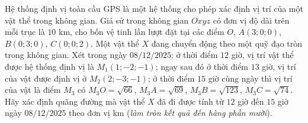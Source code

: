 \begin{ex}%
	Hệ thống định vị toàn cầu GPS là một hệ thống cho phép xác định vị trí của một vật thể trong không gian. Giả sử trong không gian $Oxyz$ có đơn vị độ dài trên mỗi trục là $10$ km, cho bốn vệ tinh lần lượt đặt tại các điểm $O$, $A(3;0;0)$, $B(0;3;0)$, $C(0;0;2)$. Một vật thể $X$ đang chuyển động theo một quỹ đạo tròn trong không gian. Xét trong ngày $08/12/2025$: ở thời điểm $12$ giờ, vị trí vật thể được hệ thống định vị là $M_1(1;-2;-1)$; ngay sau đó ở thời điểm $13$ giờ, vị trí của vật được định vị ở $M_2(2;-3;-1)$; ở thời điểm $15$ giờ cùng ngày thì vị trí của vật là điểm $M_3$ có $M_3O= \sqrt{66}$, $M_3A = \sqrt{69}$, $M_3B = \sqrt{123}$, $M_3C = \sqrt{74}$. Hãy xác định quãng đường mà vật thể $X$ đã đi được tính từ $12$ giờ đến $15$ giờ ngày $08/12/2025$ theo đơn vị km (\textit{làm tròn kết quả đến hàng phần mười}).
	\begin{center}
		\newcommand{\veTraiDat}{
			\begin{scope}[shift={(-2.75,-4.48)}] %

\end{scope}}
\end{center}
\end{ex}
